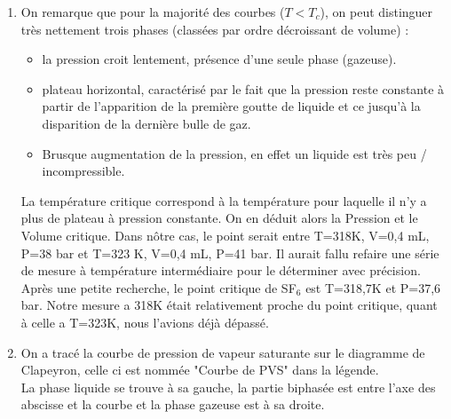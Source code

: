 \documentclass[12pt,a4paper]{article}
\begin{document}
\begin{enumerate}
\item On remarque que pour la majorité des courbes ($T<T_{c}$), on peut distinguer très nettement trois phases (classées par ordre décroissant de volume) :

\begin{itemize}[label=\textbullet]
\item la pression croit lentement, présence d'une seule phase (gazeuse).
\item plateau horizontal, caractérisé par le fait que la pression reste constante à partir de l'apparition de la première goutte de liquide et ce jusqu'à la disparition de la dernière bulle de gaz.
\item Brusque augmentation de la pression, en effet un liquide est très peu / incompressible.
\end{itemize}

La température critique correspond à la température pour laquelle il n'y a plus de plateau à pression constante. On en déduit alors la Pression et le Volume critique.
Dans nôtre cas, le point serait entre T=318K, V=0,4 mL, P=38 bar et T=323 K, V=0,4 mL, P=41 bar.
Il aurait fallu refaire une série de mesure à température intermédiaire pour le déterminer avec précision.\\
Après une petite recherche, le point critique de SF$_{6}$ est T=318,7K et P=37,6 bar. Notre mesure a 318K était relativement proche du point critique, quant à celle a T=323K, nous l'avions déjà dépassé.
 
\item On a tracé la courbe de pression de vapeur saturante sur le diagramme de Clapeyron, celle ci est nommée "Courbe de PVS" dans la légende. \\
La phase liquide se trouve à sa gauche, la partie biphasée est entre l'axe des abscisse et la courbe et la phase gazeuse est à sa droite.


\end{enumerate}
\end{document}
